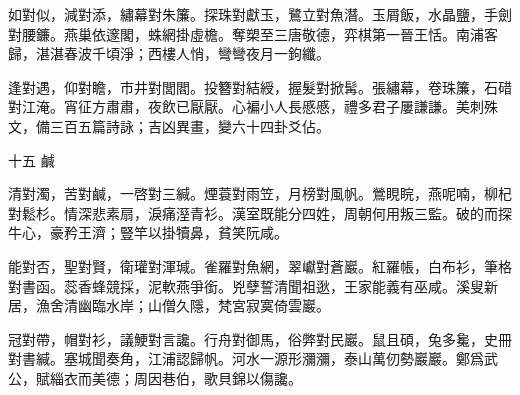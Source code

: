 \documentclass[12pt,a4paper]{ctexbook}
\begin{document}
如對似，減對添，繡幕對朱簾。探珠對獻玉，鷺立對魚潛。玉屑飯，水晶鹽，手劍對腰鐮。燕巢依邃閣，蛛網掛虛檐。奪槊至三唐敬德，弈棋第一晉王恬。南浦客歸，湛湛春波千頃淨；西樓人悄，彎彎夜月一鉤纖。\par
逢對遇，仰對瞻，市井對閭閻。投簪對結綬，握髮對掀髯。張繡幕，卷珠簾，石碏對江淹。宵征方肅肅，夜飲已厭厭。心褊小人長慼慼，禮多君子屢謙謙。美刺殊文，備三百五篇詩詠；吉凶異畫，變六十四卦爻佔。\par
十五 鹹\par
清對濁，苦對鹹，一啓對三緘。煙蓑對雨笠，月榜對風帆。鶯睍睆，燕呢喃，柳杞對鬆杉。情深悲素扇，淚痛溼青衫。漢室既能分四姓，周朝何用叛三監。破的而探牛心，豪矜王濟；豎竿以掛犢鼻，貧笑阮咸。\par
能對否，聖對賢，衛瓘對渾瑊。雀羅對魚網，翠巘對蒼巖。紅羅帳，白布衫，筆格對書函。蕊香蜂競採，泥軟燕爭銜。兇孽誓清聞祖逖，王家能義有巫咸。溪叟新居，漁舍清幽臨水岸；山僧久隱，梵宮寂寞倚雲巖。\par
冠對帶，帽對衫，議鯁對言讒。行舟對御馬，俗弊對民巖。鼠且碩，兔多毚，史冊對書緘。塞城聞奏角，江浦認歸帆。河水一源形瀰瀰，泰山萬仞勢巖巖。鄭爲武公，賦緇衣而美德；周因巷伯，歌貝錦以傷讒。\par
\end{document}
